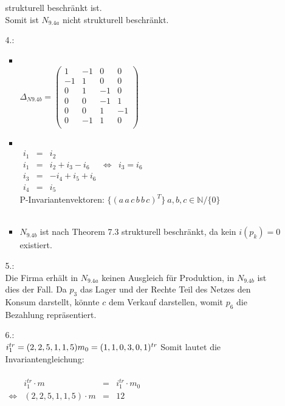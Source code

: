 \documentclass[a4paper,11pt,fleqn]{scrartcl}
\begin{document}
\begin{enumerate}
\begin{enumerate}
				strukturell beschränkt ist. \\
				Somit ist \(N_{9.4a}\) nicht strukturell beschränkt.
			\newpage
			\item[4.:]\quad \\
			\begin{itemize}
				\item \quad \\
				\( \Delta_{N9.4b} =
			\begin{pmatrix}
				1 & -1 & 0 & 0 \\
				-1 & 1 & 0 & 0 \\
				0 & 1 & -1 & 0 \\
				0 & 0 & -1 & 1 \\
				0 & 0 & 1 & -1 \\
				0 & -1 & 1 & 0 \\
			\end{pmatrix}
			\) \\
			\item \quad \\
			\(\begin{array}{rclcl}
				i_1 &=& i_2 \\
				i_1 &=& i_2 + i_3 - i_6 &\Leftrightarrow & i_3 = i_6 \\
				i_3 &=& -i_4 + i_5 + i_6 \\
				i_4 &=& i_5
			\end{array}
			\) \\
			P-Invariantenvektoren: \(\Big\{(a\,a\,c\,b\,b\,c)^T\Big\}\ a,b,c\in\mathbb{N}/\{0\}\) \\ \\
			\item \(N_{9.4b}\) ist nach Theorem 7.3 strukturell beschränkt, da kein \(i(p_k) = 0\) existiert. \\
			
			\end{itemize}
			\item[5.:]\quad \\
			Die Firma erhält in \(N_{9.4a}\) keinen Ausgleich für Produktion, in \(N_{9.4b}\) ist dies der Fall.
			Da \(p_3\) das Lager und der Rechte Teil des Netzes den Konsum darstellt, könnte \(c\) dem Verkauf 
			darstellen, womit \(p_6\) die Bezahlung repräsentiert.
			\item[6.:]\quad \\
			\(
				i_1^{tr} = (2,2,5,1,1,5) \\
				m_0 = (1,1,0,3,0,1)^{tr} \\
				\\
			\)
			Somit lautet die Invariantengleichung: \\
			\\
			\(
			\begin{array}{crcr}
				& i_1^{tr} \cdot m &=& i_1^{tr} \cdot m_0 \\
				\Leftrightarrow & (2,2,5,1,1,5) \cdot m &=& 12
			\end{array}
			\)
		\end{enumerate}
	\end{enumerate}
\end{document}
